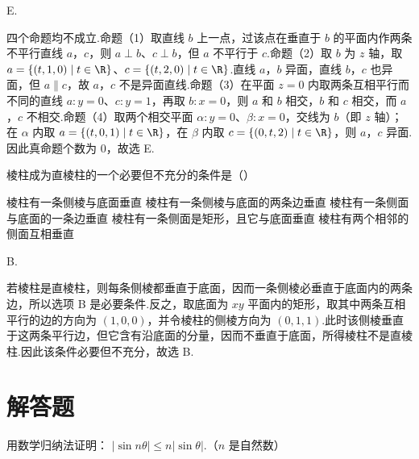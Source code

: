 \begin{answer}
E.
\end{answer}

\begin{solution}
四个命题均不成立.命题（1）取直线 \(b\) 上一点，过该点在垂直于 \(b\) 的平面内作两条不平行直线 \(a\)，\(c\)，则 \(a\perp b\)、\(c\perp b\)，但 \(a\) 不平行于 \(c\).命题（2）取 \(b\) 为 \(z\) 轴，取 \(a=\{(t,1,0)\mid t\in\R\}\)、\(c=\{(t,2,0)\mid t\in\R\}\).直线 \(a\)，\(b\) 异面，直线 \(b\)，\(c\) 也异面，但 \(a\parallel c\)，故 \(a\)，\(c\) 不是异面直线.命题（3）在平面 \(z=0\) 内取两条互相平行而不同的直线 \(a:y=0\)、\(c:y=1\)，再取 \(b:x=0\)，则 \(a\) 和 \(b\) 相交，\(b\) 和 \(c\) 相交，而 \(a\)，\(c\) 不相交.命题（4）取两个相交平面 \(\alpha:y=0\)、\(\beta:x=0\)，交线为 \(b\)（即 \(z\) 轴）；在 \(\alpha\) 内取 \(a=\{(t,0,1)\mid t\in\R\}\)，在 \(\beta\) 内取 \(c=\{(0,t,2)\mid t\in\R\}\)，则 \(a\)，\(c\) 异面.因此真命题个数为 \(0\)，故选 E.
\end{solution}

\begin{problem}

棱柱成为直棱柱的一个必要但不充分的条件是（\quad）

\choicesfive
    {棱柱有一条侧棱与底面垂直}
    {棱柱有一条侧棱与底面的两条边垂直}
    {棱柱有一条侧面与底面的一条边垂直}
    {棱柱有一条侧面是矩形，且它与底面垂直}
    {棱柱有两个相邻的侧面互相垂直}
\end{problem}

\begin{answer}
B.
\end{answer}

\begin{solution}
若棱柱是直棱柱，则每条侧棱都垂直于底面，因而一条侧棱必垂直于底面内的两条边，所以选项 B 是必要条件.反之，取底面为 \(xy\) 平面内的矩形，取其中两条互相平行的边的方向为 \((1,0,0)\)，并令棱柱的侧棱方向为 \((0,1,1)\).此时该侧棱垂直于这两条平行边，但它含有沿底面的分量，因而不垂直于底面，所得棱柱不是直棱柱.因此该条件必要但不充分，故选 B.
\end{solution}

\section{解答题}

\begin{problem}

用数学归纳法证明： \(|\sin n\theta| \leqslant n|\sin\theta| \).（\(n\) 是自然数）
\end{problem}

